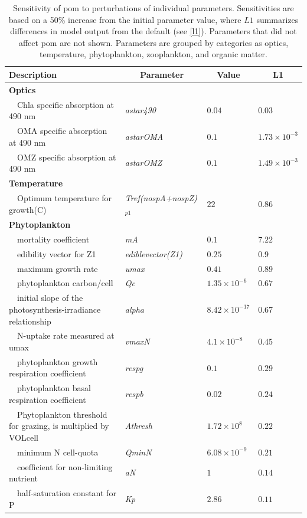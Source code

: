 \documentclass[review]{elsarticle}\usepackage[]{graphicx}\usepackage[]{color}
\begin{document}
\begin{table}[!tbp]
{\footnotesize
\caption{Sensitivity of \ac{pom} to perturbations of individual parameters.  Sensitivities are based on a 50\% increase from the initial parameter value, where $L1$ summarizes differences in model output from the default (see \cref{l1}).  Parameters that did not affect \ac{pom} are not shown.  Parameters are grouped by categories as optics, temperature, phytoplankton, zooplankton, and organic matter.\label{tab:om1sens}} 
\begin{center}
\begin{tabular}{llll}
\hline\hline
\multicolumn{1}{l}{Description}&\multicolumn{1}{c}{Parameter}&\multicolumn{1}{c}{Value}&\multicolumn{1}{c}{L1}\tabularnewline
\hline
{\bfseries Optics}&&&\tabularnewline
~~Chla specific absorption at 490 nm&\textit{astar490}&$0.04$&$0.03$\tabularnewline
~~OMA specific absorption at 490 nm&\textit{astarOMA}&$0.1$&$1.73\times 10^{-3}$\tabularnewline
~~OMZ specific absorption at 490 nm&\textit{astarOMZ}&$0.1$&$1.49\times 10^{-3}$\tabularnewline
\hline
{\bfseries Temperature}&&&\tabularnewline
~~Optimum temperature for growth(C)&\textit{Tref(nospA+nospZ)$_{p1}$}&$22$&$0.86$\tabularnewline
\hline
{\bfseries Phytoplankton}&&&\tabularnewline
~~mortality coefficient&\textit{mA}&$0.1$&$7.22$\tabularnewline
~~edibility vector for Z1&\textit{ediblevector(Z1)}&$0.25$&$0.9$\tabularnewline
~~maximum growth rate&\textit{umax}&$0.41$&$0.89$\tabularnewline
~~phytoplankton carbon/cell&\textit{Qc}&$1.35\times 10^{-6}$&$0.67$\tabularnewline
~~initial slope of the photosynthesis-irradiance relationship&\textit{alpha}&$8.42\times 10^{-17}$&$0.67$\tabularnewline
~~N-uptake rate measured at umax&\textit{vmaxN}&$4.1\times 10^{-8}$&$0.45$\tabularnewline
~~phytoplankton growth respiration coefficient&\textit{respg}&$0.1$&$0.29$\tabularnewline
~~phytoplankton basal respiration coefficient&\textit{respb}&$0.02$&$0.24$\tabularnewline
~~Phytoplankton threshold for grazing, is multiplied by VOLcell&\textit{Athresh}&$1.72\times 10^{8}$&$0.22$\tabularnewline
~~minimum N cell-quota&\textit{QminN}&$6.08\times 10^{-9}$&$0.21$\tabularnewline
~~coefficient for non-limiting nutrient&\textit{aN}&$1$&$0.14$\tabularnewline
~~half-saturation constant for P&\textit{Kp}&$2.86$&$0.11$\tabularnewline

\end{tabular}
\end{center}}
\end{table}
\end{document}
